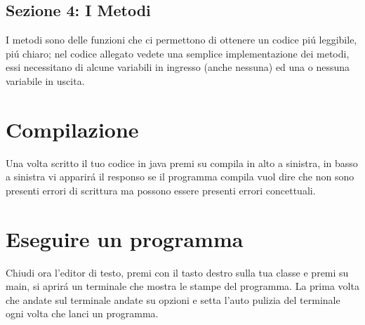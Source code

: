 \documentclass{article}
\begin{document}
\subsection{Sezione 4: I Metodi}
    \noindent I metodi sono delle funzioni che ci permettono di ottenere un codice piú leggibile, piú chiaro; nel codice allegato vedete una semplice implementazione dei metodi, essi necessitano di alcune variabili in ingresso (anche nessuna) ed una o nessuna variabile in uscita.

\section{Compilazione}
\noindent Una volta scritto il tuo codice in java premi su compila in alto a sinistra, in basso a sinistra vi apparirá il responso se il programma compila vuol dire che non sono presenti errori di scrittura ma possono essere presenti errori concettuali.

\section{Eseguire un programma}
\noindent Chiudi ora l'editor di testo, premi con il tasto destro sulla tua classe e premi su main, si aprirá un terminale che mostra le stampe del programma.
La prima volta che andate sul terminale andate su opzioni e setta l'auto pulizia del terminale ogni volta che lanci un programma.
\end{document}
